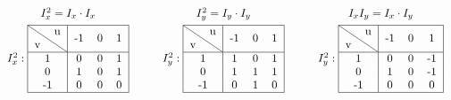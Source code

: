 $$
	\begin{array}{ccccc}
		I_x^2  = I_x \cdot I_x             & \phantom{\quad} & I_y^2  = I_y \cdot I_y & \phantom{\quad} & I_xI_y  = I_x \cdot I_y \\[4pt]
		I_x^2  :  \begin{tabular}{|c|ccc|}
			          \hline
			          \diagbox{v}{u} & -1 & 0 & 1 \\
			          \hline
			          1              & 0  & 0 & 1 \\
			          0              & 1  & 0 & 1 \\
			          -1             & 0  & 0 & 0 \\
			          \hline
		          \end{tabular} &                 &
		I_y^2  : \begin{tabular}{|c|ccc|}
			         \hline
			         \diagbox{v}{u} & -1 & 0 & 1 \\
			         \hline
			         1              & 1  & 0 & 1 \\
			         0              & 1  & 1 & 1 \\
			         -1             & 0  & 1 & 0 \\
			         \hline
		         \end{tabular}
		                                   &                 &
		I_y^2  : \begin{tabular}{|c|ccc|}
			         \hline
			         \diagbox{v}{u} & -1 & 0 & 1  \\
			         \hline
			         1              & 0  & 0 & -1 \\
			         0              & 1  & 0 & -1 \\
			         -1             & 0  & 0 & 0  \\
			         \hline
		         \end{tabular}
	\end{array}
$$ \\
